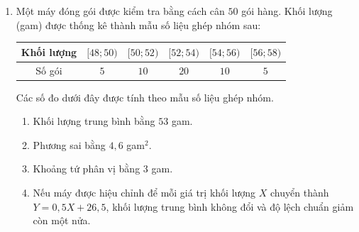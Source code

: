 \documentclass[12pt,a4paper]{article}
\begin{document}
\begin{enumerate}
\item Một máy đóng gói được kiểm tra bằng cách cân $50$ gói hàng. Khối lượng (gam) được thống kê thành mẫu số liệu ghép nhóm sau:
\begin{center}
\begin{tabular}{|c|c|c|c|c|c|}\hline
Khối lượng & $[48;50)$ & $[50;52)$ & $[52;54)$ & $[54;56)$ & $[56;58)$\\\hline
Số gói & $5$ & $10$ & $20$ & $10$ & $5$\\\hline
\end{tabular}
\end{center}
Các số đo dưới đây được tính theo mẫu số liệu ghép nhóm.
\begin{enumerate}[label=\alph*)]
\item Khối lượng trung bình bằng $53$ gam.
\item Phương sai bằng $4{,}6$ gam$^2$.
\item Khoảng tứ phân vị bằng $3$ gam.
\item Nếu máy được hiệu chỉnh để mỗi giá trị khối lượng $X$ chuyển thành $Y=0{,}5X+26{,}5$, khối lượng trung bình không đổi và độ lệch chuẩn giảm còn một nửa.
\end{enumerate}
\end{enumerate}

\end{document}
